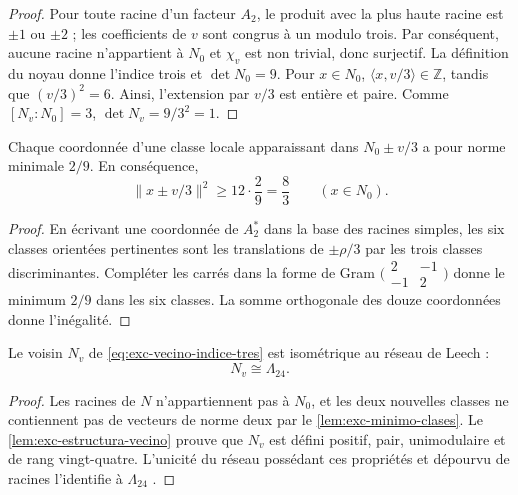 \begin{proof}
Pour toute racine d'un facteur \(A_2\), le produit avec la plus haute racine est
\(\pm1\) ou \(\pm2\) ; les coefficients de \(v\) sont congrus à un
modulo trois. Par conséquent, aucune racine n'appartient à \(N_0\) et \(\chi_v\) est
non trivial, donc surjectif. La définition du noyau donne l'indice trois et
\(\det N_0=9\). Pour \(x\in N_0\),
\(\langle x,v/3\rangle\in\mathbb Z\), tandis que
\((v/3)^2=6\). Ainsi, l'extension par \(v/3\) est entière et paire. Comme
\([N_v:N_0]=3\),
\(\det N_v=9/3^2=1\).
\end{proof}

\begin{lemma}
\label{lem:exc-minimo-clases}
Chaque coordonnée d'une classe locale apparaissant dans
\(N_0\pm v/3\) a pour norme minimale \(2/9\). En conséquence,
\[
 \|x\pm v/3\|^2\ge12\cdot\frac29=\frac83
 \qquad(x\in N_0).
\]
\end{lemma}

\begin{proof}
En écrivant une coordonnée de \(A_2^*\) dans la base des racines simples, les
six classes orientées pertinentes sont les translations de
\(\pm\rho/3\) par les trois classes discriminantes. Compléter les carrés dans la
forme de Gram
\(\bigl(\begin{smallmatrix}2&-1\\-1&2\end{smallmatrix}\bigr)\)
donne le minimum \(2/9\) dans les six classes. La somme orthogonale des douze
coordonnées donne l'inégalité.
\end{proof}

\begin{theorem}
\label{thm:exc-leech}
Le voisin \(N_v\) de \eqref{eq:exc-vecino-indice-tres} est isométrique au
réseau de Leech :
\begin{equation}
 \boxed{N_v\cong\Lambda_{24}.}
 \label{eq:exc-leech}
\end{equation}
\end{theorem}

\begin{proof}
Les racines de \(N\) n'appartiennent pas à \(N_0\), et les deux nouvelles classes ne
contiennent pas de vecteurs de norme deux par le
\cref{lem:exc-minimo-clases}. Le \cref{lem:exc-estructura-vecino} prouve que
\(N_v\) est défini positif, pair, unimodulaire et de rang vingt-quatre.
L'unicité du réseau possédant ces propriétés et dépourvu de racines l'identifie à
\(\Lambda_{24}\) \citep{ConwaySloane1999}.
\end{proof}


